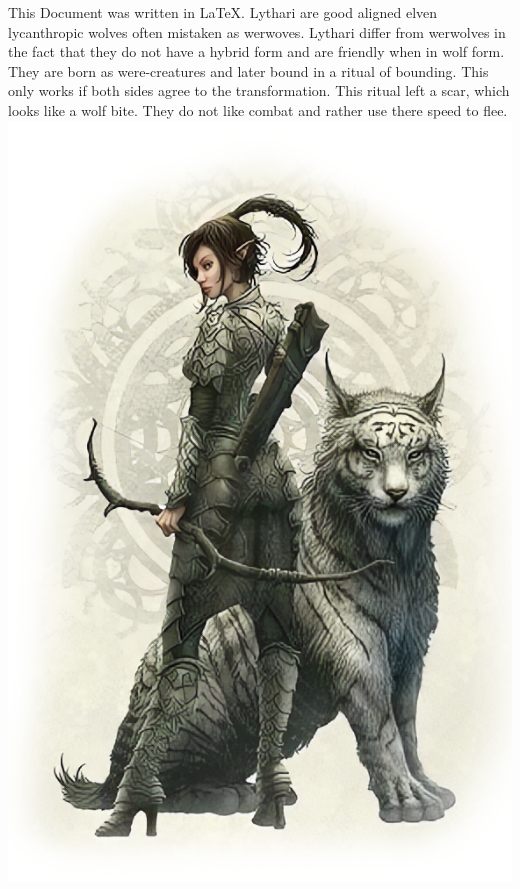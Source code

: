 \documentclass[a4paper,10pt,twoside,twocolumn, bg=print]{dndbook} %
\begin{document}
	\vfill\hbox{}\vfill\hfill{\tiny This Document was written in \LaTeX.}\twocolumn
	Lythari are good aligned elven lycanthropic wolves often mistaken as werwoves. Lythari differ from werwolves in the fact that they do not have a hybrid form and are friendly when in wolf form. They are born as were-creatures and later bound in a ritual of bounding. This only works if both sides agree to the transformation. This ritual left a scar, which looks like a wolf bite.\linebreak
	They do not like combat and rather use there speed to flee.
	\includegraphics[width=\linewidth]{lythari1.png}
\end{document}
